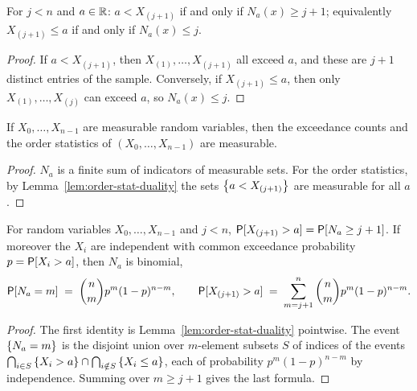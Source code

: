 \begin{lemma}
  \label{lem:order-stat-duality}
  \leanok
  For $j < n$ and $a \in \mathbb{R}$: $a < X_{(j+1)}$ if and only if $N_a(x) \ge j + 1$; equivalently
  $X_{(j+1)} \le a$ if and only if $N_a(x) \le j$.
\end{lemma}
\begin{proof}
  \leanok
  If $a < X_{(j+1)}$, then $X_{(1)}, \ldots, X_{(j+1)}$ all exceed $a$, and these are $j + 1$
  distinct entries of the sample. Conversely, if $X_{(j+1)} \le a$, then only
  $X_{(1)}, \ldots, X_{(j)}$ can exceed $a$, so $N_a(x) \le j$.
\end{proof}

\begin{lemma}[Measurability]
  \label{lem:order-stat-measurable}
  \leanok
  If $X_0, \ldots, X_{n-1}$ are measurable random variables, then the exceedance counts and the
  order statistics of $(X_0, \ldots, X_{n-1})$ are measurable.
\end{lemma}
\begin{proof}
  \leanok
  $N_a$ is a finite sum of indicators of measurable sets. For the order statistics, by
  Lemma~\ref{lem:order-stat-duality} the sets $\left\{  a < X_{(j+1)}  \right\}$ are measurable for all $a$.
\end{proof}

\begin{theorem}
  \label{thm:exceed-count-binomial}
  \leanok
  For random variables $X_0, \ldots, X_{n-1}$ and $j < n$,
  $\mathsf{P}[X_{(j+1)} > a] = \mathsf{P}[N_a \ge j + 1]$. If moreover the $X_i$ are independent with common
  exceedance probability $p = \mathsf{P}[X_i > a]$, then $N_a$ is binomial,
  \begin{align*}
    \mathsf{P}[N_a = m] \; = \; \binom{n}{m} p^m (1 - p)^{n - m} ,
    \qquad
    \mathsf{P}[X_{(j+1)} > a] \; = \; \sum_{m = j+1}^{n} \binom{n}{m} p^m (1 - p)^{n - m} .
  \end{align*}
\end{theorem}
\begin{proof}
  \leanok
  The first identity is Lemma~\ref{lem:order-stat-duality} pointwise. The event $\left\{ N_a = m \right\}$ is
  the disjoint union over $m$-element subsets $S$ of indices of the events
  $\bigcap_{i \in S} \left\{ X_i > a \right\} \cap \bigcap_{i \notin S} \left\{ X_i \le a \right\}$, each of probability
  $p^m (1 - p)^{n-m}$ by independence. Summing over $m \ge j + 1$ gives the last formula.
\end{proof}

